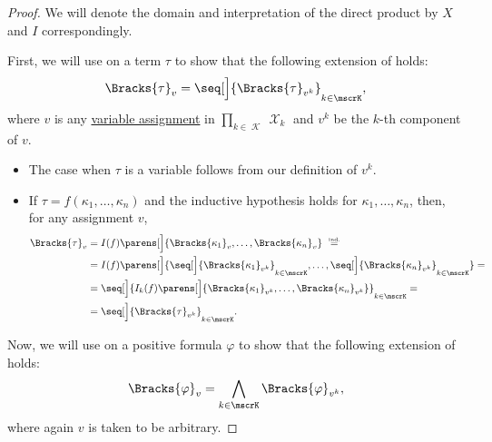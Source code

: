 \begin{proof}
  We will denote the domain and interpretation of the direct product by \( X \) and \( I \) correspondingly.

  First, we will use  on a term \( \tau \) to show that the following extension of  holds:
  \begin{equation}\label{eq:thm:direct_product_preserves_positive_formulas/hypothesis_terms}
    \Bracks{\tau}_v = \seq[\Big]{ \Bracks{\tau}_{v^k} }_{k \in \mscrK},
  \end{equation}
  where \( v \) is any \hyperref[def:first_order_valuation/variable_assignment]{variable assignment} in \( \prod_{k \in \mscrK} \mscrX_k \) and \( v^k \) be the \( k \)-th component of \( v \).

  \begin{itemize}
    \item The case when \( \tau \) is a variable follows from our definition of \( v^k \).
    \item If \( \tau = f(\kappa_1, \ldots, \kappa_n) \) and the inductive hypothesis holds for \( \kappa_1, \ldots, \kappa_n \), then, for any assignment \( v \),
    \begin{align*}
      \Bracks{\tau}_v
      &=
      I(f) \parens[\Big]{ \Bracks{\kappa_1}_v, \ldots, \Bracks{\kappa_n}_v }
      \reloset {\T{ind.}} = \\ &=
      I(f) \parens[\Big]{ \seq[\Big]{ \Bracks{\kappa_1}_{v^k} }_{k \in \mscrK}, \ldots, \seq[\Big]{ \Bracks{\kappa_n}_{v^k} }_{k \in \mscrK} }
      = \\ &=
      \seq[\Big]{ I_k(f) \parens[\Big]{ \Bracks{\kappa_1}_{v^k}, \ldots, \Bracks{\kappa_n}_{v^k} } }_{k \in \mscrK}
      = \\ &=
      \seq[\Big]{ \Bracks{\tau}_{v^k} }_{k \in \mscrK}.
    \end{align*}
  \end{itemize}

  Now, we will use  on a positive formula \( \varphi \) to show that the following extension of  holds:
  \begin{equation}\label{eq:thm:direct_product_preserves_positive_formulas/hypothesis_formulas}
    \Bracks{\varphi}_v = \bigwedge_{k \in \mscrK} \Bracks{\varphi}_{v^k},
  \end{equation}
  where again \( v \) is taken to be arbitrary.


\end{proof}
